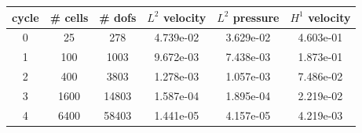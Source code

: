 \documentclass[10pt]{report}
\begin{document}
\begin{table}[H]
\begin{center}
\begin{tabular}{|c|c|c|c|c|c|} \hline
cycle & \# cells & \# dofs & $L^2$ velocity & $L^2$ pressure & $H^1$ velocity\\ \hline
0 & 25 & 278 & 4.739e-02 & 3.629e-02 & 4.603e-01\\ \hline
1 & 100 & 1003 & 9.672e-03 & 7.438e-03 & 1.873e-01\\ \hline
2 & 400 & 3803 & 1.278e-03 & 1.057e-03 & 7.486e-02\\ \hline
3 & 1600 & 14803 & 1.587e-04 & 1.895e-04 & 2.219e-02\\ \hline
4 & 6400 & 58403 & 1.441e-05 & 4.157e-05 & 4.219e-03\\ \hline
\end{tabular}
\end{center}
\end{table}
\end{document}
